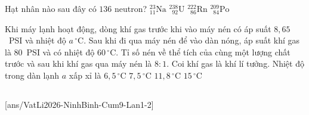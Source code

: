 	\begin{ex}%
		Hạt nhân nào sau đây có $136$ neutron?
		\choice
		{${}^{23}_{11}\text{Na}$}
		{${}^{238}_{\phantom{2}92}\text{U}$}
		{\True ${}^{222}_{\phantom{2}86}\text{Rn}$}
		{${}^{209}_{\phantom{2}84}\text{Po}$}
	\end{ex}

	\begin{ex}%
		Khi máy lạnh hoạt động, dòng khí gas trước khi vào máy nén có áp suất $8{,}65$~PSI và nhiệt độ $a\,^\circ\text{C}$. Sau khi đi qua máy nén để vào dàn nóng, áp suất khí gas là $80$~PSI và có nhiệt độ $60\,^\circ\text{C}$. Tỉ số nén về thể tích của cùng một lượng chất trước và sau khi khí gas qua máy nén là $8:1$. Coi khí gas là khí lí tưởng. Nhiệt độ trong dàn lạnh $a$ xấp xỉ là
		\choice
		{$6{,}5\,^\circ\text{C}$}
		{$7{,}5\,^\circ\text{C}$}
		{$11{,}8\,^\circ\text{C}$}
		{\True $15\,^\circ\text{C}$}
	\end{ex}

	\subsection*{}
	\setcounter{ex}{0}
	[ans/VatLi2026-NinhBinh-Cum9-Lan1-2]

